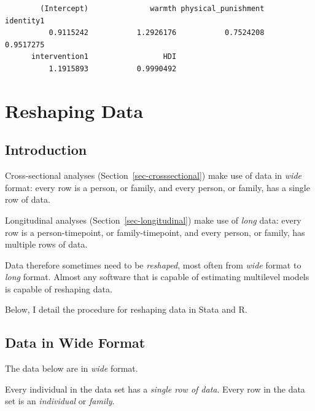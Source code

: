 \documentclass[
  letterpaper,
  DIV=11,
  numbers=noendperiod]{scrreprt}
\begin{document}
\begin{verbatim}
        (Intercept)              warmth physical_punishment           identity1 
          0.9115242           1.2926176           0.7524208           0.9517275 
      intervention1                 HDI 
          1.1915893           0.9990492 
\end{verbatim}


\chapter{Reshaping Data}\label{sec-reshape}

\section{Introduction}\label{introduction-1}

Cross-sectional analyses (Section~\ref{sec-crosssectional}) make use of
data in \emph{wide} format: every row is a person, or family, and every
person, or family, has a single row of data.

Longitudinal analyses (Section~\ref{sec-longitudinal}) make use of
\emph{long} data: every row is a person-timepoint, or family-timepoint,
and every person, or family, has multiple rows of data.

Data therefore sometimes need to be \emph{reshaped}, most often from
\emph{wide} format to \emph{long} format. Almost any software that is
capable of estimating multilevel models is capable of reshaping data.

Below, I detail the procedure for reshaping data in Stata and R.

\section{Data in Wide Format}\label{data-in-wide-format}

\begin{tcolorbox}[enhanced jigsaw, colback=white, left=2mm, arc=.35mm, breakable, colbacktitle=quarto-callout-note-color!10!white, colframe=quarto-callout-note-color-frame, leftrule=.75mm, opacityback=0, titlerule=0mm, title=\textcolor{quarto-callout-note-color}{\faInfo}\hspace{0.5em}{Note}, toptitle=1mm, toprule=.15mm, bottomrule=.15mm, bottomtitle=1mm, rightrule=.15mm, opacitybacktitle=0.6, coltitle=black]

The data below are in \emph{wide} format.

Every individual in the data set has a \emph{single row of data}. Every
row in the data set is an \emph{individual} or \emph{family}.

\end{tcolorbox}
\end{document}
